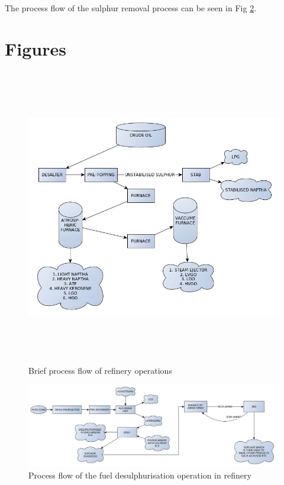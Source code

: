 \documentclass{report}
\begin{document}
	The process flow of the sulphur removal process can be seen in Fig \ref{sulphur_removal_flow}.
	\clearpage
	\pagebreak
	\section{Figures}
	\begin{figure}[h]
		\centering
		\includegraphics[width=\linewidth,height=13cm]{refinery_flow}
		\caption{Brief process flow of refinery operations}
		\label{refinery_flow}
	\end{figure}
	\begin{figure}[h]
		\centering
		\includegraphics[width=\linewidth]{sulphur_removal_flow}
		\caption{Process flow of the fuel desulphurisation operation in refinery}
		\label{sulphur_removal_flow}
	\end{figure}
\end{document}
